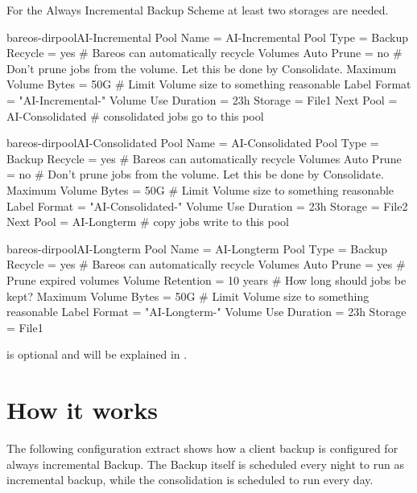 For the Always Incremental Backup Scheme at least two storages are needed.

\begin{bareosConfigResource}{bareos-dir}{pool}{AI-Incremental}
Pool {
  Name = AI-Incremental
  Pool Type = Backup
  Recycle = yes                       # Bareos can automatically recycle Volumes
  Auto Prune = no                     # Don't prune jobs from the volume. Let this be done by Consolidate.
  Maximum Volume Bytes = 50G          # Limit Volume size to something reasonable
  Label Format = "AI-Incremental-"
  Volume Use Duration = 23h
  Storage = File1
  Next Pool = AI-Consolidated         # consolidated jobs go to this pool
}
\end{bareosConfigResource}

\begin{bareosConfigResource}{bareos-dir}{pool}{AI-Consolidated}
Pool {
  Name = AI-Consolidated
  Pool Type = Backup
  Recycle = yes                       # Bareos can automatically recycle Volumes
  Auto Prune = no                     # Don't prune jobs from the volume. Let this be done by Consolidate.
  Maximum Volume Bytes = 50G          # Limit Volume size to something reasonable
  Label Format = "AI-Consolidated-"
  Volume Use Duration = 23h
  Storage = File2
  Next Pool = AI-Longterm             # copy jobs write to this pool
}
\end{bareosConfigResource}

\begin{bareosConfigResource}{bareos-dir}{pool}{AI-Longterm}
Pool {
  Name = AI-Longterm
  Pool Type = Backup
  Recycle = yes                       # Bareos can automatically recycle Volumes
  Auto Prune = yes                    # Prune expired volumes
  Volume Retention = 10 years         # How long should jobs be kept?
  Maximum Volume Bytes = 50G          # Limit Volume size to something reasonable
  Label Format = "AI-Longterm-"
  Volume Use Duration = 23h
  Storage = File1
}
\end{bareosConfigResource}

 is optional and will be explained in .

\section{How it works}

The following configuration extract shows how a client backup is configured for always incremental Backup.
The Backup itself is scheduled every night to run as incremental backup, while the consolidation is scheduled to run every day.

